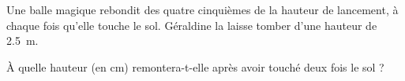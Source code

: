 %
%
    Une balle magique rebondit des quatre cinquièmes de la hauteur de lancement,
    à chaque fois qu'elle touche le sol. Géraldine la laisse tomber d'une
    hauteur de \SI{2,5}{m}.\par
    À quelle hauteur (en cm) remontera-t-elle après avoir touché deux fois le
    sol ?
